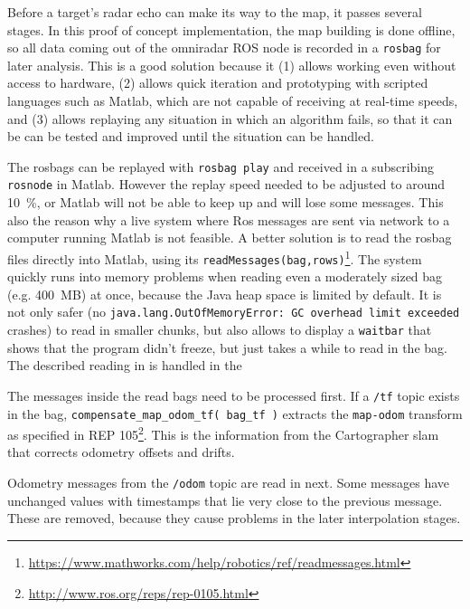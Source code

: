 Before a target's radar echo can make its way to the map, it passes several stages. In this proof of concept implementation, the map building is done offline, so all data coming out of the omniradar ROS node is recorded in a \texttt{rosbag} for later analysis. This is a good solution because it (1) allows working even without access to hardware, (2) allows quick iteration and prototyping with scripted languages such as Matlab, which are not capable of receiving at real-time speeds, and (3) allows replaying any situation in which an algorithm fails, so that it can be can be tested and improved until the situation can be handled.

The rosbags can be replayed with \texttt{rosbag play} and received in a subscribing \texttt{rosnode} in Matlab. However the replay speed needed to be adjusted to around \SI{10}{\%}, or Matlab will not be able to keep up and will lose some messages. This also the reason why a live system where Ros messages are sent via network to a computer running Matlab is not feasible. A better solution is to read the rosbag files directly into Matlab, using its \texttt{readMessages(bag,rows)}\footnote{\url{https://www.mathworks.com/help/robotics/ref/readmessages.html}}. The system quickly runs into memory problems when reading even a moderately sized bag (e.g. \SI{400}{MB}) at once, because the Java heap space is limited by default. It is not only safer (no \texttt{java.lang.OutOfMemoryError: GC overhead limit exceeded} crashes) to read in smaller chunks, but also allows to display a \texttt{waitbar} that shows that the program didn't freeze, but just takes a while to read in the bag. The described reading in is handled in the
\begin{Shaded}
\begin{Highlighting}[]
\end{Highlighting}
\end{Shaded}
The messages inside the read bags need to be processed first. If a \texttt{/tf} topic exists in the bag, \texttt{compensate\_map\_odom\_tf( bag\_tf )} extracts the \texttt{map-odom} transform as specified in REP 105\footnote{\url{http://www.ros.org/reps/rep-0105.html}}. This is the information from the Cartographer slam that corrects odometry offsets and drifts.

Odometry messages from the \texttt{/odom} topic are read in next. Some messages have unchanged values with timestamps that lie very close to the previous message. These are removed, because they cause problems in the later interpolation stages.

